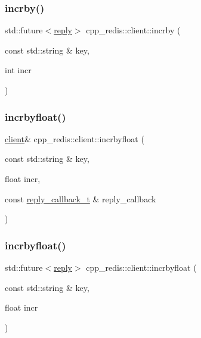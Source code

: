 \mbox{\label{classcpp__redis_1_1client_ab7dbabc00708da38938bb461b195f177}} 
\subsubsection{\texorpdfstring{incrby()}{incrby()}\hspace{0.1cm}{\footnotesize\ttfamily [2/2]}}
{\footnotesize\ttfamily std\+::future$<$\hyperlink{classcpp__redis_1_1reply}{reply}$>$ cpp\+\_\+redis\+::client\+::incrby (\begin{DoxyParamCaption}\item[{const std\+::string \&}]{key,  }\item[{int}]{incr }\end{DoxyParamCaption})}

\mbox{\label{classcpp__redis_1_1client_a3ae6ca0b7896748a8fe5a450550c422e}} 
\subsubsection{\texorpdfstring{incrbyfloat()}{incrbyfloat()}\hspace{0.1cm}{\footnotesize\ttfamily [1/2]}}
{\footnotesize\ttfamily \hyperlink{classcpp__redis_1_1client}{client}\& cpp\+\_\+redis\+::client\+::incrbyfloat (\begin{DoxyParamCaption}\item[{const std\+::string \&}]{key,  }\item[{float}]{incr,  }\item[{const \hyperlink{classcpp__redis_1_1client_a061a1140d36d2eaeda82b09a0bb3f9f2}{reply\+\_\+callback\+\_\+t} \&}]{reply\+\_\+callback }\end{DoxyParamCaption})}

\mbox{\label{classcpp__redis_1_1client_a32c78234437f7f02492e3e01dd44bc43}} 
\subsubsection{\texorpdfstring{incrbyfloat()}{incrbyfloat()}\hspace{0.1cm}{\footnotesize\ttfamily [2/2]}}
{\footnotesize\ttfamily std\+::future$<$\hyperlink{classcpp__redis_1_1reply}{reply}$>$ cpp\+\_\+redis\+::client\+::incrbyfloat (\begin{DoxyParamCaption}\item[{const std\+::string \&}]{key,  }\item[{float}]{incr }\end{DoxyParamCaption})}

